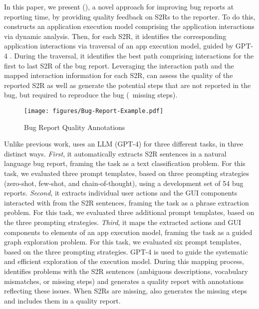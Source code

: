 In this paper, we present \tool (\toolTitle), a novel approach for improving bug reports at reporting time, by providing quality feedback on S2Rs to the reporter. To do this, \tool constructs an application execution model comprising the application interactions via dynamic analysis. Then, for each S2R, it identifies the corresponding application interactions via traversal of an app execution model, guided by GPT-4 \cite{chatgpt}. During the traversal, it identifies the best path comprising interactions for the first to last S2R of the bug report. Leveraging the interaction path and the mapped interaction information for each S2R, \tool can assess the quality of the reported S2R as well as generate the potential steps that are not reported in the bug, but required to reproduce the bug (\ie\ missing steps). 

\begin{figure*}[t]
		\centering
		\texttt{[image: figures/Bug-Report-Example.pdf]}
		\caption{Bug Report Quality Annotations}
		\label{fig:bug-report}
		\vspace{-0.3cm}
\end{figure*}

Unlike previous work, \tool uses an LLM (GPT-4) for three different tasks, in three distinct ways. 
\textit{First}, it automatically extracts S2R sentences in a natural language bug report, framing the task as a text classification problem.
For this task, we evaluated three prompt templates, based on three prompting strategies (\ie zero-shot, few-shot, and chain-of-thought),  using a development set of 54 bug reports.
\textit{Second}, it extracts individual user actions and the GUI components interacted with from the S2R sentences, framing the task as a phrase extraction problem.
For this task, we evaluated three additional prompt templates, based on the three prompting strategies.
\textit{Third}, it maps the extracted actions and GUI components to elements of an app execution model, framing the task as a guided graph exploration problem.
For this task, we evaluated six prompt templates, based on the three prompting strategies.
GPT-4 is used to guide the systematic and efficient exploration of the execution model.
During this mapping process, \tool identifies problems with the S2R sentences (\eg ambiguous descriptions, vocabulary mismatches, or missing steps) and generates a quality report with annotations reflecting these issues.
When S2Rs are missing, \tool also generates the missing steps and includes them in a quality report.


